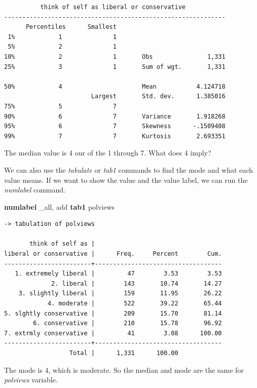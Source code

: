 \documentclass[
]{book}
\newenvironment{Shaded}{\begin{snugshade}}{\end{snugshade}}
\newcommand{\DataTypeTok}[1]{\textcolor[rgb]{0.13,0.29,0.53}{#1}}
\newcommand{\KeywordTok}[1]{\textcolor[rgb]{0.13,0.29,0.53}{\textbf{#1}}}
\newcommand{\NormalTok}[1]{#1}
\begin{document}
\begin{verbatim}
          think of self as liberal or conservative
-------------------------------------------------------------
      Percentiles      Smallest
 1%            1              1
 5%            2              1
10%            2              1       Obs               1,331
25%            3              1       Sum of wgt.       1,331

50%            4                      Mean           4.124718
                        Largest       Std. dev.      1.385016
75%            5              7
90%            6              7       Variance       1.918268
95%            6              7       Skewness      -.1509408
99%            7              7       Kurtosis       2.693351
\end{verbatim}

The median value is 4 our of the 1 through 7. What does 4 imply?

We can also use the \emph{tabulate} or \emph{tab1} commands to find the mode and what each value means. If we want to show the value and the value label, we can run the \emph{numlabel} command.

\begin{Shaded}
\begin{Highlighting}[]
\KeywordTok{numlabel} \DataTypeTok{\_all}\NormalTok{, add}
\KeywordTok{tab1}\NormalTok{ polviews}
\end{Highlighting}
\end{Shaded}

\begin{verbatim}
-> tabulation of polviews  

       think of self as |
liberal or conservative |      Freq.     Percent        Cum.
------------------------+-----------------------------------
   1. extremely liberal |         47        3.53        3.53
             2. liberal |        143       10.74       14.27
    3. slightly liberal |        159       11.95       26.22
            4. moderate |        522       39.22       65.44
5. slghtly conservative |        209       15.70       81.14
        6. conservative |        210       15.78       96.92
7. extrmly conservative |         41        3.08      100.00
------------------------+-----------------------------------
                  Total |      1,331      100.00
\end{verbatim}

The mode is 4, which is moderate. So the median and mode are the same for \emph{polviews} variable.
\end{document}
